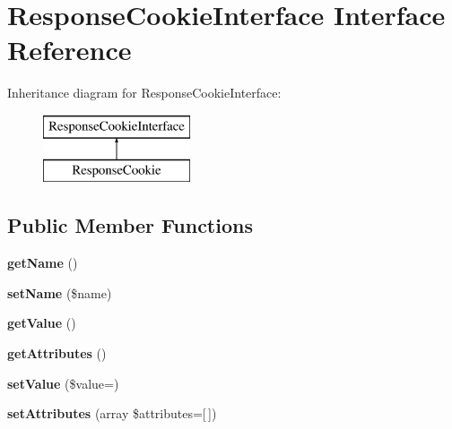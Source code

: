 \hypertarget{interface_pes_1_1_http_1_1_cookies_1_1_response_cookie_interface}{}\section{Response\+Cookie\+Interface Interface Reference}
\label{interface_pes_1_1_http_1_1_cookies_1_1_response_cookie_interface}
Inheritance diagram for Response\+Cookie\+Interface\+:\begin{figure}[H]
\begin{center}
\leavevmode
\includegraphics[height=2.000000cm]{interface_pes_1_1_http_1_1_cookies_1_1_response_cookie_interface}
\end{center}
\end{figure}
\subsection*{Public Member Functions}
\begin{DoxyCompactItemize}
\item 
\mbox{\label{interface_pes_1_1_http_1_1_cookies_1_1_response_cookie_interface_a3d0963e68bb313b163a73f2803c64600}} 
{\bfseries get\+Name} ()
\item 
\mbox{\label{interface_pes_1_1_http_1_1_cookies_1_1_response_cookie_interface_a2fe666694997d047711d7653eca2f132}} 
{\bfseries set\+Name} (\$name)
\item 
\mbox{\label{interface_pes_1_1_http_1_1_cookies_1_1_response_cookie_interface_ac0bc18784b182c89fcfd276625aef435}} 
{\bfseries get\+Value} ()
\item 
\mbox{\label{interface_pes_1_1_http_1_1_cookies_1_1_response_cookie_interface_afbe85ec4b9947cc951c67d63911cf0a4}} 
{\bfseries get\+Attributes} ()
\item 
\mbox{\label{interface_pes_1_1_http_1_1_cookies_1_1_response_cookie_interface_a284ad325a01dfad382452db96d0cd5c0}} 
{\bfseries set\+Value} (\$value=\textquotesingle{}\textquotesingle{})
\item 
\mbox{\label{interface_pes_1_1_http_1_1_cookies_1_1_response_cookie_interface_a9510d3a1a07572eeb03d9ccd1c4290c2}} 
{\bfseries set\+Attributes} (array \$attributes=\mbox{[}$\,$\mbox{]})
\end{DoxyCompactItemize}


